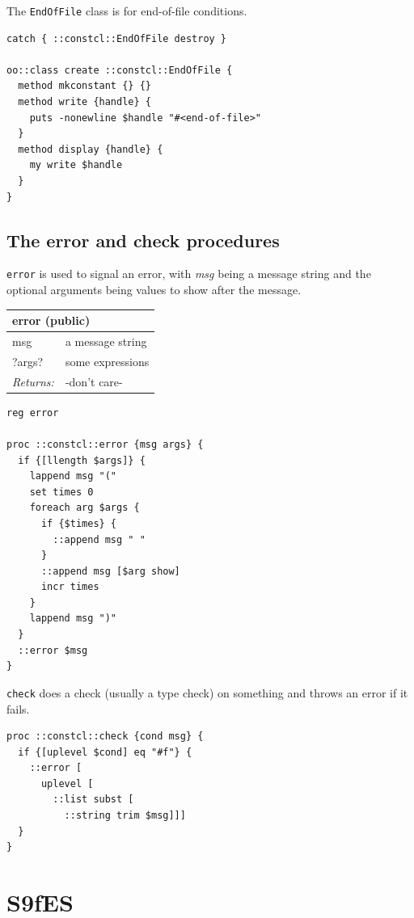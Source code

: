 \documentclass[twoside,9pt]{report}
\begin{document}
The \texttt{EndOfFile} class is for end-of-file conditions.

\noindent\makebox[\linewidth]{\rule{\linewidth}{0.4pt}}
\begin{lstlisting}
catch { ::constcl::EndOfFile destroy }
 
oo::class create ::constcl::EndOfFile {
  method mkconstant {} {}
  method write {handle} {
    puts -nonewline $handle "#<end-of-file>"
  }
  method display {handle} {
    my write $handle
  }
}
\end{lstlisting}
\noindent\makebox[\linewidth]{\rule{\linewidth}{0.4pt}}
\section{The error and check procedures}
\label{the-error-and-check-procedures}

\texttt{error} is used to signal an error, with \emph{msg} being a message string and the optional arguments being values to show after the message.

\begin{tabular}{ |l l| }
\hline
\multicolumn{2}{|l|}{error (public)} \\
\hline
msg & a message string \\
?args? & some expressions \\
\textit{Returns:} & -don't care- \\
\hline
\end{tabular}

\noindent\makebox[\linewidth]{\rule{\linewidth}{0.4pt}}
\begin{lstlisting}
reg error
 
proc ::constcl::error {msg args} {
  if {[llength $args]} {
    lappend msg "("
    set times 0
    foreach arg $args {
      if {$times} {
        ::append msg " "
      }
      ::append msg [$arg show]
      incr times
    }
    lappend msg ")"
  }
  ::error $msg
}
\end{lstlisting}
\noindent\makebox[\linewidth]{\rule{\linewidth}{0.4pt}}

\texttt{check} does a check (usually a type check) on something and throws an error if it fails.

\noindent\makebox[\linewidth]{\rule{\linewidth}{0.4pt}}
\begin{lstlisting}
proc ::constcl::check {cond msg} {
  if {[uplevel $cond] eq "#f"} {
    ::error [
      uplevel [
        ::list subst [
          ::string trim $msg]]]
  }
}
\end{lstlisting}
\noindent\makebox[\linewidth]{\rule{\linewidth}{0.4pt}}
\chapter{S9fES}
\label{s9fes}
\end{document}
